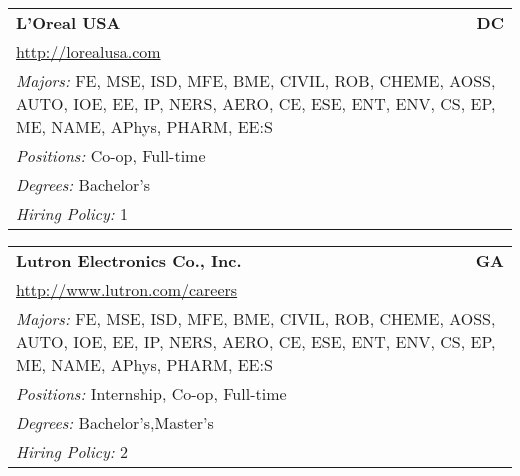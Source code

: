 \documentclass[twoside]{article}
\begin{document}
\begin{center}
\begin{multicols}{3}
\begin{FlushLeft}
\begin{minipage}{\columnwidth}\begin{tabularx}{.95\columnwidth}{Xr}
                 {\Large\bf L'Oreal USA} & {\Large\bf DC}\\
    \multicolumn{2}{p{.95\columnwidth}}{\url{http://lorealusa.com}}\\
    \multicolumn{2}{p{.95\columnwidth}}{\emph{Majors:} FE, MSE, ISD, MFE, BME, CIVIL, ROB, CHEME, AOSS, AUTO, IOE, EE, IP, NERS, AERO, CE, ESE, ENT, ENV, CS, EP, ME, NAME, APhys, PHARM, EE:S}\\
    \multicolumn{2}{p{.95\columnwidth}}{\emph{Positions:} Co-op, Full-time}\\
    \multicolumn{2}{p{.95\columnwidth}}{\emph{Degrees:} Bachelor's}\\
    \multicolumn{2}{p{.95\columnwidth}}{\emph{Hiring Policy:} 1}\\
    \end{tabularx}
    
\end{minipage}
 
\begin{minipage}{\columnwidth}\begin{tabularx}{.95\columnwidth}{Xr}
                 {\Large\bf Lutron Electronics Co., Inc.} & {\Large\bf GA}\\
    \multicolumn{2}{p{.95\columnwidth}}{\url{http://www.lutron.com/careers}}\\
    \multicolumn{2}{p{.95\columnwidth}}{\emph{Majors:} FE, MSE, ISD, MFE, BME, CIVIL, ROB, CHEME, AOSS, AUTO, IOE, EE, IP, NERS, AERO, CE, ESE, ENT, ENV, CS, EP, ME, NAME, APhys, PHARM, EE:S}\\
    \multicolumn{2}{p{.95\columnwidth}}{\emph{Positions:} Internship, Co-op, Full-time}\\
    \multicolumn{2}{p{.95\columnwidth}}{\emph{Degrees:} Bachelor's,Master's}\\
    \multicolumn{2}{p{.95\columnwidth}}{\emph{Hiring Policy:} 2}\\
    \end{tabularx}
    
\end{minipage}
 

\end{FlushLeft}
\end{multicols}
\end{center}
\end{document}
